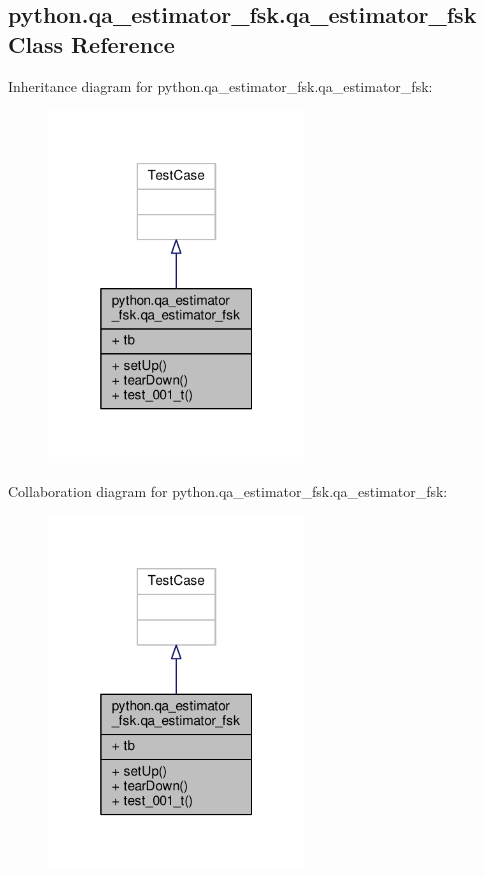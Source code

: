 \subsection{python.\+qa\+\_\+estimator\+\_\+fsk.\+qa\+\_\+estimator\+\_\+fsk Class Reference}
\label{classpython_1_1qa__estimator__fsk_1_1qa__estimator__fsk}


Inheritance diagram for python.\+qa\+\_\+estimator\+\_\+fsk.\+qa\+\_\+estimator\+\_\+fsk\+:
\nopagebreak
\begin{figure}[H]
\begin{center}
\leavevmode
\includegraphics[width=193pt]{d6/dca/classpython_1_1qa__estimator__fsk_1_1qa__estimator__fsk__inherit__graph}
\end{center}
\end{figure}


Collaboration diagram for python.\+qa\+\_\+estimator\+\_\+fsk.\+qa\+\_\+estimator\+\_\+fsk\+:
\nopagebreak
\begin{figure}[H]
\begin{center}
\leavevmode
\includegraphics[width=193pt]{de/d68/classpython_1_1qa__estimator__fsk_1_1qa__estimator__fsk__coll__graph}
\end{center}
\end{figure}

